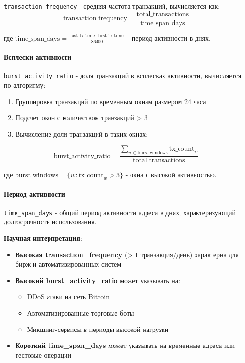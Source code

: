 \texttt{transaction\_frequency} - средняя частота транзакций, вычисляется как:
\begin{equation}
    \text{transaction\_frequency} = \frac{\text{total\_transactions}}{\text{time\_span\_days}}
\end{equation}

где $\text{time\_span\_days} = \frac{\text{last\_tx\_time} - \text{first\_tx\_time}}{86400}$ - период активности в днях.

\paragraph{Всплески активности}

\texttt{burst\_activity\_ratio} - доля транзакций в всплесках активности, вычисляется по алгоритму:

\begin{enumerate}
    \item Группировка транзакций по временным окнам размером 24 часа
    \item Подсчет окон с количеством транзакций > 3
    \item Вычисление доли транзакций в таких окнах:
\end{enumerate}

\begin{equation}
    \text{burst\_activity\_ratio} = \frac{\sum_{w \in \text{burst\_windows}} \text{tx\_count}_w}{\text{total\_transactions}}
\end{equation}

где $\text{burst\_windows} = \{w : \text{tx\_count}_w > 3\}$ - окна с высокой активностью.

\paragraph{Период активности}

\texttt{time\_span\_days} - общий период активности адреса в днях, характеризующий долгосрочность использования.

\textbf{Научная интерпретация}:
\begin{itemize}
    \item \textbf{Высокая transaction\_frequency} (> 1 транзакция/день) характерна для бирж и автоматизированных систем
    \item \textbf{Высокий burst\_activity\_ratio} может указывать на:
        \begin{itemize}
            \item DDoS атаки на сеть Bitcoin
            \item Автоматизированные торговые боты
            \item Микшинг-сервисы в периоды высокой нагрузки
        \end{itemize}
    \item \textbf{Короткий time\_span\_days} может указывать на временные адреса или тестовые операции
\end{itemize}

